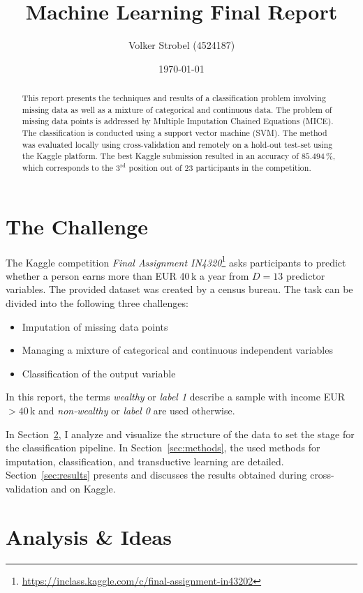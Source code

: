\documentclass[a4paper]{article}
\title{Machine Learning Final Report}
\author{Volker Strobel (4524187)}
\date{\today}
\begin{document}
\maketitle
\begin{abstract}
  This report presents the techniques and results of a classification
  problem involving missing data as well as a mixture of categorical
  and continuous data. The problem of missing data points is addressed
  by Multiple Imputation Chained Equations (MICE). The classification is
  conducted using a support vector machine (SVM). The method was
  evaluated locally using cross-validation and remotely on a hold-out
  test-set using the Kaggle platform. The best Kaggle submission
  resulted in an accuracy of $85.494\,\%$, which corresponds to the
  $3^{\text{rd}}$ position out of $23$ participants in the
  competition.%
\end{abstract}%
\section{The Challenge}
\label{sec:introduction}

The Kaggle competition \emph{Final Assignment
  IN4320}\footnote{\url{https://inclass.kaggle.com/c/final-assignment-in43202}}
asks participants to predict whether a person earns more than EUR
40\,k a year from $D = 13$ predictor variables. The provided dataset
was created by a census bureau. The task can be divided into the
following three challenges:

\begin{itemize}
\item Imputation of missing data points
\item Managing a mixture of categorical and continuous independent
  variables
\item Classification of the output variable
\end{itemize}

In this report, the terms \emph{wealthy} or \emph{label 1} describe a
sample with income EUR $>40\,$k and \emph{non-wealthy} or \emph{label
  0} are used otherwise.

In Section~\ref{sec:analysis}, I analyze and visualize the structure
of the data to set the stage for the classification pipeline. In
Section~\ref{sec:methods}, the used methods for imputation,
classification, and transductive learning are
detailed. Section~\ref{sec:results} presents and discusses the results
obtained during cross-validation and on Kaggle.

\section{Analysis \& Ideas}
\label{sec:analysis}
\end{document}
